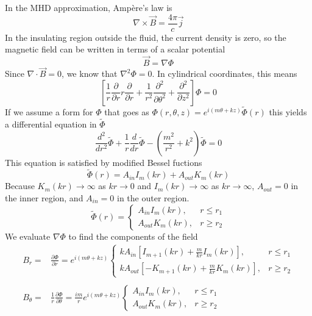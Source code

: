 \documentclass[letterpaper]{article}
\begin{document}
In the MHD approximation, Amp\`{e}re's law is
\begin{equation}
\nabla \times \vec{B} = \frac{4\pi}{c}\vec{j}
\end{equation}
In the insulating region outside the fluid, the current density is
zero, so the magnetic field can be written in terms of a scalar
potential
\begin{equation}
\vec{B} = \nabla\Phi
\end{equation}
Since $\nabla\cdot\vec{B} = 0$, we know that $\nabla^2 \Phi = 0$.  In
cylindrical coordinates, this means
\begin{equation}
\left[\frac{1}{r}\frac{\partial}{\partial r}r\frac{\partial}{\partial r} 
 + \frac{1}{r^2}\frac{\partial^2}{\partial\theta^2}
 + \frac{\partial^2}{\partial z^2}\right]\Phi = 0
\end{equation}
If we assume a form for $\Phi$ that goes as $\Phi(r,\theta,z) =
e^{i(m\theta + k z)}\tilde{\Phi}(r)$ this yields a differential
equation in $\tilde{\Phi}$
\begin{equation}
\frac{d^2}{d r^2}\tilde{\Phi} + \frac{1}{r}\frac{d}{dr}\tilde{\Phi} 
 - \left(\frac{m^2}{r^2} + k^2\right)\tilde{\Phi} = 0
\end{equation}
This equation is satisfied by modified Bessel fuctions
\begin{equation}
\tilde{\Phi}(r) = A_{in} I_m (k r) + A_{out} K_m (k r)
\end{equation}
Because $K_m(kr)\rightarrow \infty$ as $k r \rightarrow 0$ and
$I_m(kr) \rightarrow \infty$ as $k r \rightarrow \infty$, $A_{out} =
0$ in the inner region, and $A_{in} = 0$ in the outer region.
\begin{equation}
\tilde{\Phi}(r) = \begin{cases}
                     A_{in} I_m(k r), &r \le r_1 \\
                     A_{out} K_m(k r), &r \ge r_2
                  \end{cases}
\end{equation}
We evaluate $\nabla \Phi$ to find the components of the field
\begin{align}
B_r = &\frac{\partial \Phi}{\partial r} = e^{i(m\theta + kz)}
 \begin{cases}
   kA_{in}\left[I_{m+1}(kr) + \frac{m}{kr}I_{m}(kr)\right], &r \le r_1 \\
   kA_{out}\left[-K_{m+1}(kr) + \frac{m}{kr}K_{m}(kr)\right], &r \ge r_2
 \end{cases}
\\
\nonumber \\
B_\theta = &\frac{1}{r}\frac{\partial \Phi}{\partial \theta} 
         = \frac{im}{r}e^{i(m\theta + kz)}
           \begin{cases}
             A_{in} I_m(k r), &r \le r_1 \\
             A_{out} K_m(k r), &r \ge r_2
           \end{cases}
\end{align}
\end{document}
